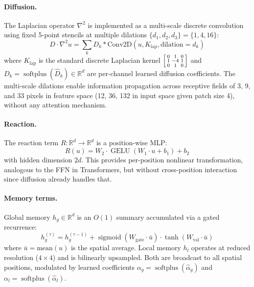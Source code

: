 \documentclass{article}
\newcommand{\R}{\mathbb{R}}
\newcommand{\lapl}{\nabla^2}
\DeclareMathOperator{\softplus}{softplus}
\DeclareMathOperator{\sigmoid}{sigmoid}
\DeclareMathOperator{\gelu}{GELU}
\begin{document}
\paragraph{Diffusion.} The Laplacian operator $\lapl$ is implemented as a multi-scale discrete convolution using fixed 5-point stencils at multiple dilations $\{d_1, d_2, d_3\} = \{1, 4, 16\}$:
\begin{equation}
    D \cdot \lapl u = \sum_{k} D_k \ast \text{Conv2D}(u, K_{\text{lap}}, \text{dilation}=d_k)
\end{equation}
where $K_{\text{lap}}$ is the standard discrete Laplacian kernel $\begin{bsmallmatrix}0&1&0\\1&-4&1\\0&1&0\end{bsmallmatrix}$ and $D_k = \softplus(\hat{D}_k) \in \R^{d}$ are per-channel learned diffusion coefficients. The multi-scale dilations enable information propagation across receptive fields of 3, 9, and 33 pixels in feature space (12, 36, 132 in input space given patch size 4), without any attention mechanism.

\paragraph{Reaction.} The reaction term $R: \R^d \to \R^d$ is a position-wise MLP:
\begin{equation}
    R(u) = W_2 \cdot \gelu(W_1 \cdot u + b_1) + b_2
\end{equation}
with hidden dimension $2d$. This provides per-position nonlinear transformation, analogous to the FFN in Transformers, but without cross-position interaction since diffusion already handles that.

\paragraph{Memory terms.} Global memory $h_g \in \R^d$ is an $O(1)$ summary accumulated via a gated recurrence:
\begin{equation}
    h_g^{(\tau)} = h_g^{(\tau-1)} + \sigmoid(W_{\text{gate}} \cdot \bar{u}) \cdot \tanh(W_{\text{val}} \cdot \bar{u})
\end{equation}
where $\bar{u} = \text{mean}(u)$ is the spatial average. Local memory $h_l$ operates at reduced resolution ($4 \times 4$) and is bilinearly upsampled. Both are broadcast to all spatial positions, modulated by learned coefficients $\alpha_g = \softplus(\hat{\alpha}_g)$ and $\alpha_l = \softplus(\hat{\alpha}_l)$.
\end{document}
